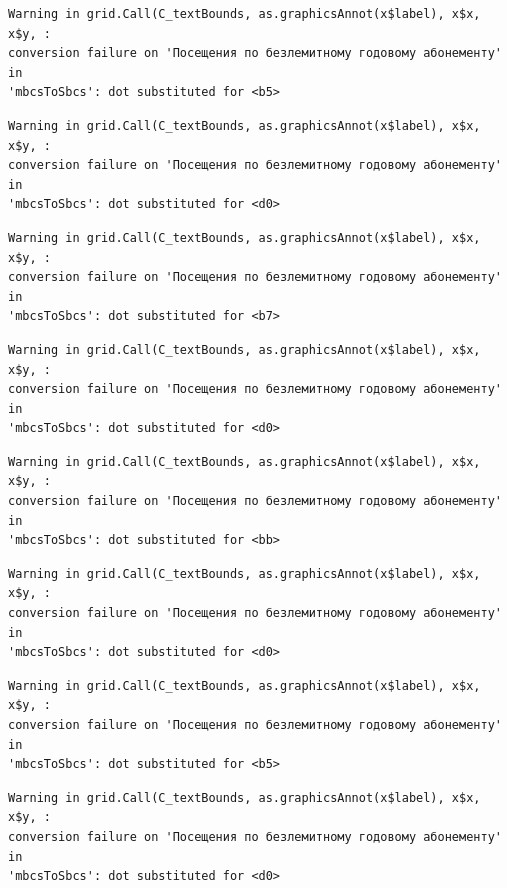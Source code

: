 \documentclass[
  letterpaper,
  DIV=11,
  numbers=noendperiod]{scrartcl}
\begin{document}
\begin{verbatim}
Warning in grid.Call(C_textBounds, as.graphicsAnnot(x$label), x$x, x$y, :
conversion failure on 'Посещения по безлемитному годовому абонементу' in
'mbcsToSbcs': dot substituted for <b5>
\end{verbatim}

\begin{verbatim}
Warning in grid.Call(C_textBounds, as.graphicsAnnot(x$label), x$x, x$y, :
conversion failure on 'Посещения по безлемитному годовому абонементу' in
'mbcsToSbcs': dot substituted for <d0>
\end{verbatim}

\begin{verbatim}
Warning in grid.Call(C_textBounds, as.graphicsAnnot(x$label), x$x, x$y, :
conversion failure on 'Посещения по безлемитному годовому абонементу' in
'mbcsToSbcs': dot substituted for <b7>
\end{verbatim}

\begin{verbatim}
Warning in grid.Call(C_textBounds, as.graphicsAnnot(x$label), x$x, x$y, :
conversion failure on 'Посещения по безлемитному годовому абонементу' in
'mbcsToSbcs': dot substituted for <d0>
\end{verbatim}

\begin{verbatim}
Warning in grid.Call(C_textBounds, as.graphicsAnnot(x$label), x$x, x$y, :
conversion failure on 'Посещения по безлемитному годовому абонементу' in
'mbcsToSbcs': dot substituted for <bb>
\end{verbatim}

\begin{verbatim}
Warning in grid.Call(C_textBounds, as.graphicsAnnot(x$label), x$x, x$y, :
conversion failure on 'Посещения по безлемитному годовому абонементу' in
'mbcsToSbcs': dot substituted for <d0>
\end{verbatim}

\begin{verbatim}
Warning in grid.Call(C_textBounds, as.graphicsAnnot(x$label), x$x, x$y, :
conversion failure on 'Посещения по безлемитному годовому абонементу' in
'mbcsToSbcs': dot substituted for <b5>
\end{verbatim}

\begin{verbatim}
Warning in grid.Call(C_textBounds, as.graphicsAnnot(x$label), x$x, x$y, :
conversion failure on 'Посещения по безлемитному годовому абонементу' in
'mbcsToSbcs': dot substituted for <d0>
\end{verbatim}
\end{document}
